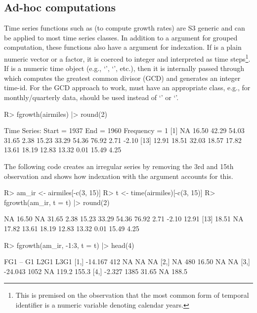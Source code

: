 \documentclass[article]{jss}
\newcommand{\class}[1]{`\code{#1}'}
\newcommand{\fct}[1]{\code{#1()}}
\begin{document}
\subsection{Ad-hoc computations}
%
Time series functions such as \fct{fgrowth} (to compute growth rates) are S3 generic and can be applied to most time series classes. In addition to a  argument for grouped computation, these functions also have a  argument for indexation. If  is a plain numeric vector or a factor, it is coerced to integer and interpreted as time steps\footnote{This is premised on the observation that the most common form of temporal identifier is a numeric variable denoting calendar years.}. If  is a numeric time object (e.g., \class{Date}, \class{POSIXct}, etc.), then it is internally passed through  which computes the greatest common divisor (GCD) and generates an integer time-id. For the GCD approach to work,  must have an appropriate class, e.g., for monthly/quarterly data,  should be used instead of \class{Date} or \class{POSIXct}. %
%
\begin{Schunk}
\begin{Sinput}
R> fgrowth(airmiles) |> round(2)
\end{Sinput}
\begin{Soutput}
Time Series:
Start = 1937 
End = 1960 
Frequency = 1 
 [1]    NA 16.50 42.29 54.03 31.65  2.38 15.23 33.29 54.36 76.92  2.71 -2.10
[13] 12.91 18.51 32.03 18.57 17.82 13.61 18.19 12.83 13.32  0.01 15.49  4.25
\end{Soutput}
\end{Schunk}
The following code creates an irregular series by removing the 3rd and 15th observation and shows how indexation with the  argument accounts for this.
%
\begin{Schunk}
\begin{Sinput}
R> am_ir <- airmiles[-c(3, 15)]
R> t <- time(airmiles)[-c(3, 15)]
R> fgrowth(am_ir, t = t) |> round(2)
\end{Sinput}
\begin{Soutput}
 [1]    NA 16.50    NA 31.65  2.38 15.23 33.29 54.36 76.92  2.71 -2.10 12.91
[13] 18.51    NA 17.82 13.61 18.19 12.83 13.32  0.01 15.49  4.25
\end{Soutput}
\begin{Sinput}
R> fgrowth(am_ir, -1:3, t = t) |> head(4)
\end{Sinput}
\begin{Soutput}
         FG1   --    G1  L2G1  L3G1
[1,] -14.167  412    NA    NA    NA
[2,]      NA  480 16.50    NA    NA
[3,] -24.043 1052    NA 119.2 155.3
[4,]  -2.327 1385 31.65    NA 188.5
\end{Soutput}
\end{Schunk}
\end{document}

